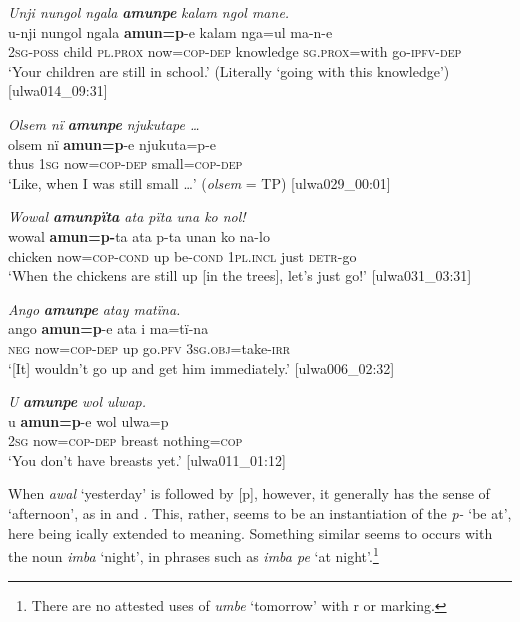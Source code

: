 \ea%
    \label{ex:otherwc:52}
          \textit{Unji nungol ngala} \textbf{\textit{amunpe}} \textit{kalam ngol mane.}\\
\gll    u-nji    nungol  ngala    \textbf{amun=p}{}-e    kalam nga=ul      ma-n-e\\
    2\textsc{sg-poss}  child  \textsc{pl.prox}  now=\textsc{cop-dep}  knowledge  \textsc{sg.prox=}with  go-\textsc{ipfv-dep}\\
\glt `Your children are still in school.’ (Literally ‘going with this knowledge’) [ulwa014\_09:31]
\z

\ea%
    \label{ex:otherwc:53}
          \textit{Olsem nï} \textbf{\textit{amunpe}} \textit{njukutape …}\\
\gll    olsem  nï    \textbf{amun=p}-e    njukuta=p-e\\
    thus  \textsc{1sg}  now=\textsc{cop-dep}  small=\textsc{cop-dep}\\
\glt `Like, when I was still small …’ (\textit{olsem} = TP) [ulwa029\_00:01]
\z

\ea%
    \label{ex:otherwc:54}
          \textit{Wowal \textbf{amunpïta} ata pïta una ko nol!}\\
\gll    wowal    \textbf{amun=p-}ta    ata  p-ta    unan    ko na-lo\\
    chicken  now=\textsc{cop-cond}  up  be\textsc{{}-cond}  \textsc{1pl.incl} just    \textsc{detr-}go\\
\glt `When the chickens are still up [in the trees], let’s just go!’ [ulwa031\_03:31]
\z

\ea%
    \label{ex:otherwc:55}
          \textit{Ango} \textbf{\textit{amunpe}} \textit{atay matïna.}\\
\gll    ango  \textbf{amun=p}{}-e    ata  i    ma=tï-na\\
    \textsc{neg}  now=\textsc{cop-dep}  up  go.\textsc{pfv}  3\textsc{sg.obj}=take-\textsc{irr}\\
\glt `[It] wouldn’t go up and get him immediately.’ [ulwa006\_02:32]
\z

\ea%
    \label{ex:otherwc:56}
          \textit{U} \textbf{\textit{amunpe}} \textit{wol ulwap.}\\
\gll    u    \textbf{amun=p}{}-e    wol  ulwa=p\\
    2\textsc{sg}  now=\textsc{cop-dep}  breast  nothing=\textsc{cop}\\
\glt `You don’t have breasts yet.’ [ulwa011\_01:12]
\z

When \textit{awal} ‘yesterday’ is followed by [p], however, it generally has the sense of ‘afternoon’, as in  and . This, rather, seems to be an instantiation of the  \textit{p-} ‘be at’, here being ically extended to  meaning. Something similar seems to occurs with the noun \textit{imba} ‘night’, in phrases such as \textit{imba pe} ‘at night’.\footnote{There are no attested uses of \textit{umbe} ‘tomorrow’ with r or  marking.}

